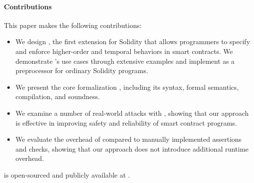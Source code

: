 


\paragraph{Contributions} This paper makes the following contributions:
\begin{itemize}
  \item We design \lang, the first extension for Solidity that allows programmers to
        specify and enforce higher-order and temporal behaviors in smart contracts.
        We demonstrate \lang's use cases through extensive examples and
        implement \lang as a preprocessor for ordinary Solidity programs.
  \item We present the core formalization \lang, including its syntax, formal
        semantics, compilation, and soundness.
  \item We examine a number of real-world attacks with \lang, showing that our
        approach is effective in improving safety and reliability of smart contract
        programs.
  \item We evaluate the overhead of \lang compared to manually implemented
        assertions and checks, showing that our approach does not introduce
        additional runtime overhead.
\end{itemize}

\lang is open-sourced and publicly available at .

